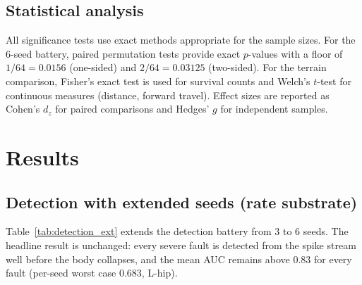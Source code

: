 \subsection{Statistical analysis}

All significance tests use exact methods appropriate for the sample sizes.
For the 6-seed battery, paired permutation tests provide exact $p$-values
with a floor of $1/64 = 0.0156$ (one-sided) and $2/64 = 0.03125$
(two-sided). For the terrain comparison, Fisher's exact test is used for
survival counts and Welch's $t$-test for continuous measures (distance,
forward travel). Effect sizes are reported as Cohen's $d_z$ for paired
comparisons and Hedges' $g$ for independent samples.

\section{Results}

\subsection{Detection with extended seeds (rate substrate)}

Table~\ref{tab:detection_ext} extends the detection battery from 3 to 6 seeds.
The headline result is unchanged: every severe fault is detected from the spike
stream well before the body collapses, and the mean AUC remains above 0.83 for
every fault (per-seed worst case 0.683, L-hip).

\begin{table}[t]
\caption{Detection AUC, detection time, and lead time for the rate substrate
with 6 seeds $\{1, 7, 13, 29, 55, 91\}$. Fault injected at $t = 2.0$\,s.}
\label{tab:detection_ext}
\centering
\small
\renewcommand{\arraystretch}{1.15}
\end{table}

